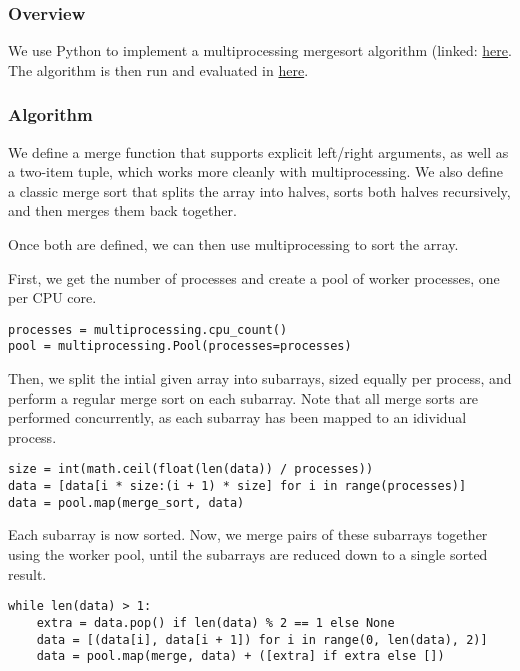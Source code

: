 \subsubsection{Overview}

We use Python to implement a multiprocessing mergesort algorithm
(linked: \href{https://github.com/cloudmesh/cloudmesh-mpi/blob/main/examples/sort/multiprocessing_mergesort.py}{here}. The
algorithm is then run and evaluated
in \href{https://github.com/cloudmesh/cloudmesh-mpi/blob/main/examples/sort/sandra.ipynb}{here}.

\subsubsection{Algorithm}

We define a merge function that supports explicit left/right arguments, as well as a two-item tuple, which works more
cleanly with multiprocessing. We also define a classic merge sort that splits the array into halves, sorts both halves
recursively, and then merges them back together.

Once both are defined, we can then use multiprocessing to sort the array.

First, we get the number of processes and create a pool of worker processes, one per CPU core.

\begin{verbatim}
processes = multiprocessing.cpu_count()
pool = multiprocessing.Pool(processes=processes)
\end{verbatim}

Then, we split the intial given array into subarrays, sized equally per process, and perform a regular merge sort on
each subarray. Note that all merge sorts are performed concurrently, as each subarray has been mapped to an idividual
process.

\begin{verbatim}
size = int(math.ceil(float(len(data)) / processes))
data = [data[i * size:(i + 1) * size] for i in range(processes)]
data = pool.map(merge_sort, data)
\end{verbatim}

Each subarray is now sorted. Now, we merge pairs of these subarrays together using the worker pool, until the subarrays
are reduced down to a single sorted result.

\begin{verbatim}
while len(data) > 1:
    extra = data.pop() if len(data) % 2 == 1 else None
    data = [(data[i], data[i + 1]) for i in range(0, len(data), 2)]
    data = pool.map(merge, data) + ([extra] if extra else [])
\end{verbatim}

